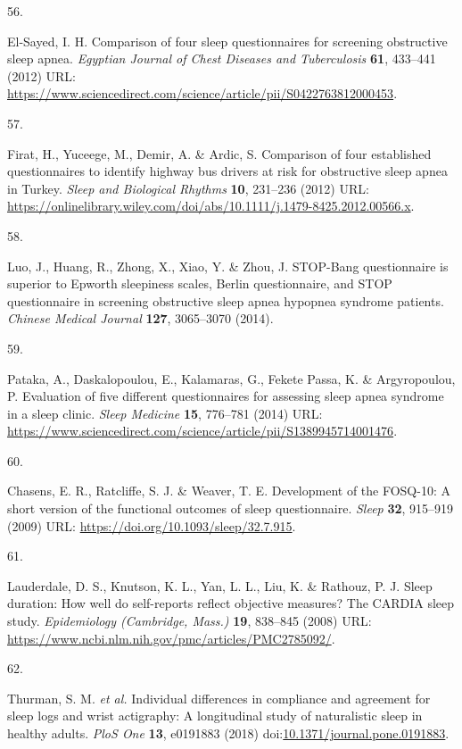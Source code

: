 \documentclass[
  10pt,
]{scrbook}
\newlength{\cslhangindent}
\newlength{\csllabelwidth}
\newlength{\cslentryspacingunit} %
\newenvironment{CSLReferences}[2] %
 {%
  \setlength{\parindent}{0pt}
  \ifodd #1
  \let\oldpar\par
  \def\par{\hangindent=\cslhangindent\oldpar}
  \fi
  \setlength{\parskip}{#2\cslentryspacingunit}
 }%
 {}
\newcommand{\CSLLeftMargin}[1]{\parbox[t]{\csllabelwidth}{#1}}
\newcommand{\CSLRightInline}[1]{\parbox[t]{\linewidth - \csllabelwidth}{#1}\break}
\let\originaltextbf\textbf
\renewcommand{\textbf}[1]{\textcolor{color1}{\textsf{\originaltextbf{#1}}}}
\begin{document}
\begin{CSLReferences}{0}{0}
\leavevmode{}%
\CSLLeftMargin{56. }%
\CSLRightInline{El-Sayed, I. H. Comparison of four sleep questionnaires
for screening obstructive sleep apnea. \emph{Egyptian Journal of Chest
Diseases and Tuberculosis} \textbf{61}, 433--441 (2012) URL:
\url{https://www.sciencedirect.com/science/article/pii/S0422763812000453}.}

\leavevmode{}%
\CSLLeftMargin{57. }%
\CSLRightInline{Firat, H., Yuceege, M., Demir, A. \& Ardic, S.
Comparison of four established questionnaires to identify highway bus
drivers at risk for obstructive sleep apnea in Turkey. \emph{Sleep and
Biological Rhythms} \textbf{10}, 231--236 (2012) URL:
\url{https://onlinelibrary.wiley.com/doi/abs/10.1111/j.1479-8425.2012.00566.x}.}

\leavevmode{}%
\CSLLeftMargin{58. }%
\CSLRightInline{Luo, J., Huang, R., Zhong, X., Xiao, Y. \& Zhou, J.
STOP-Bang questionnaire is superior to Epworth sleepiness scales, Berlin
questionnaire, and STOP questionnaire in screening obstructive sleep
apnea hypopnea syndrome patients. \emph{Chinese Medical Journal}
\textbf{127}, 3065--3070 (2014).}

\leavevmode{}%
\CSLLeftMargin{59. }%
\CSLRightInline{Pataka, A., Daskalopoulou, E., Kalamaras, G., Fekete
Passa, K. \& Argyropoulou, P. Evaluation of five different
questionnaires for assessing sleep apnea syndrome in a sleep clinic.
\emph{Sleep Medicine} \textbf{15}, 776--781 (2014) URL:
\url{https://www.sciencedirect.com/science/article/pii/S1389945714001476}.}

\leavevmode{}%
\CSLLeftMargin{60. }%
\CSLRightInline{Chasens, E. R., Ratcliffe, S. J. \& Weaver, T. E.
Development of the FOSQ-10: A short version of the functional outcomes
of sleep questionnaire. \emph{Sleep} \textbf{32}, 915--919 (2009) URL:
\url{https://doi.org/10.1093/sleep/32.7.915}.}

\leavevmode{}%
\CSLLeftMargin{61. }%
\CSLRightInline{Lauderdale, D. S., Knutson, K. L., Yan, L. L., Liu, K.
\& Rathouz, P. J. Sleep duration: How well do self-reports reflect
objective measures? The CARDIA sleep study. \emph{Epidemiology
(Cambridge, Mass.)} \textbf{19}, 838--845 (2008) URL:
\url{https://www.ncbi.nlm.nih.gov/pmc/articles/PMC2785092/}.}

\leavevmode{}%
\CSLLeftMargin{62. }%
\CSLRightInline{Thurman, S. M. \emph{et al.} Individual differences in
compliance and agreement for sleep logs and wrist actigraphy: A
longitudinal study of naturalistic sleep in healthy adults. \emph{PloS
One} \textbf{13}, e0191883 (2018)
doi:\href{https://doi.org/10.1371/journal.pone.0191883}{10.1371/journal.pone.0191883}.}


\end{CSLReferences}
\end{document}
